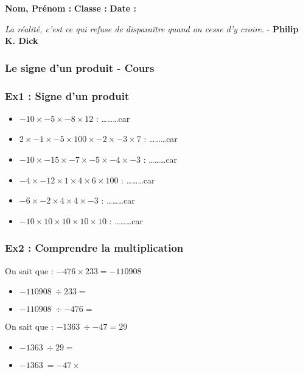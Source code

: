 \newpage

\textbf{Nom, Prénom :} \hspace{8cm} \textbf{Classe :} \hspace{3cm} \textbf{Date :}\\

\begin{center}
  \textit{La réalité, c'est ce qui refuse de disparaître quand on cesse d'y croire.}  - \textbf{Philip K. Dick}
\end{center}

\subsubsection*{Le signe d'un produit - Cours}

\Pointilles[5]

\subsubsection*{Ex1 : Signe d'un produit}

\begin{itemize}[label={$\bullet$}]
  \item $-10 \times -5 \times -8 \times 12 $  : \ldots\ldots\ldots car \dotfill 
  \item $2 \times -1 \times -5 \times 100 \times -2 \times -3 \times 7$ : \ldots\ldots\ldots car \dotfill
  \item $-10 \times -15 \times -7 \times -5 \times -4 \times -3$ : \ldots\ldots\ldots car \dotfill
  \item $-4 \times -12 \times 1 \times 4 \times 6 \times 100 $ : \ldots\ldots\ldots car \dotfill
  \item $-6 \times -2 \times 4 \times 4 \times -3 $ : \ldots\ldots\ldots car \dotfill
  \item $-10 \times 10 \times 10 \times 10 \times 10 $  : \ldots\ldots\ldots car \dotfill
\end{itemize}

\subsubsection*{Ex2 : Comprendre la multiplication}

\begin{multicols}{2}

On sait que : $-476 \times 233 = \SI{-110 908}{}$
\begin{itemize}[label={$\bullet$}]
  \item $\SI{-110 908}{} \div 233 =$ \dotfill
  \item $\SI{-110 908}{} \div -476 = $ \dotfill
\end{itemize}

On sait que : $\SI{-1 363}{} \div -47 = 29$
\begin{itemize}[label={$\bullet$}]
  \item $\SI{-1 363}{} \div 29 =$ \dotfill
  \item $\SI{-1 363}{} = -47 \times $ \dotfill
\end{itemize}

\end{multicols}

